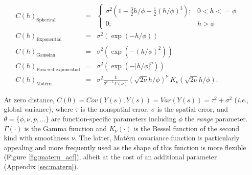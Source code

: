 \documentclass[letterpaper,portrait,11pt]{scrartcl}
\numberwithin{equation}{section}    %
\numberwithin{figure}{section}    %
\numberwithin{table}{section}       %
\begin{document}
\begin{eqnarray*}
  C(h)_{\textrm{Spherical}} &=&
    \begin{cases}
      \sigma^2( 1 - \frac{3}{2} h/\phi + \frac{1}{2}(h/\phi)^3 )  ; &   0 < h <= \phi \\
      0  ; &  h > \phi
    \end{cases}  \\
  C(h)_{\text{Exponential}} &=& \sigma^2 ( \exp(-h/\phi) )   \\
  C(h)_{\text{Gaussian}} &=& \sigma^2 ( \exp(-(h/\phi)^2) ) \\
  C(h)_{\text{Powered exponential}} &=& \sigma^2 ( \exp(-| h/\phi | ^p) ) \\
  C(h)_{\text{Mat\'{e}rn}} &=& \sigma^2 \frac{1}{2^{\nu-1}\Gamma(\nu) } ( \sqrt{2\nu} h/\phi )^\nu \ K_{\nu} ( \sqrt{2\nu} h/\phi  )  .
\end{eqnarray*}


At zero distance, $C(0) = Cov( Y(s), Y(s)) = Var(Y(s)) = \tau^2 + \sigma^2$ (\textit{i.e.}, global variance), where $\tau$ is the nonspatial error, $\sigma$ is the spatial error, and $\theta=\{\phi, \nu, p, \dots \}$ are  function-specific parameters including $\phi$ the \textit{range} parameter. $\Gamma(\cdotp)$ is the Gamma function and $K_{\nu}(\cdotp)$ is the Bessel function of the second kind with smoothness $\nu$. The latter, Mat\'{e}rn covariance function is particularly appealing and more frequently used as the shape of this function is more flexible (Figure \ref{fig:matern_acf}), albeit at the cost of an additional parameter (Appendix \ref{sec:matern}).
\end{document}
